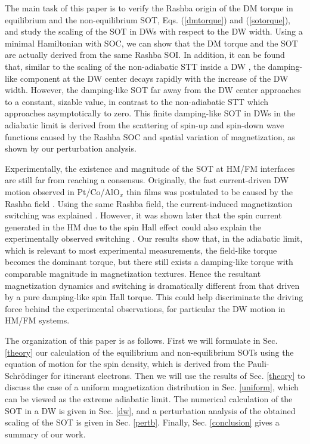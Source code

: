 \documentclass[12pt]{iopart}
\begin{document}
The main task of this paper is to verify the Rashba origin of the DM torque in equilibrium and the non-equilibrium SOT, Eqs. (\ref{dmtorque}) and (\ref{sotorque}), and study the scaling of the SOT in DWs with respect to the DW width. Using a minimal Hamiltonian with SOC, we can show that the DM torque and the SOT are actually derived from the same Rashba SOI. In addition, it can be found that, similar to the scaling of the non-adiabatic STT inside a DW \cite{Xiao06}, the damping-like component at the DW center decays rapidly with the increase of the DW width. However, the damping-like SOT far away from the DW center approaches to a constant, sizable value, in contrast to the non-adiabatic STT which approaches asymptotically to zero. This finite damping-like SOT in DWs in the adiabatic limit is derived from the scattering of spin-up and spin-down wave functions caused by the Rashba SOC and spatial variation of magnetization, as shown by our perturbation analysis.

Experimentally, the existence and magnitude of the SOT at HM/FM interfaces are still far from reaching a consensus. Originally, the fast current-driven DW motion observed in Pt/Co/AlO$_x$ thin films was postulated to be caused by the Rashba field \cite{Miron10,Miron11nm}. Using the same Rashba field, the current-induced magnetization switching was explained \cite{Miron11}. However, it was shown later that the spin current generated in the HM due to the spin Hall effect could also explain the experimentally observed switching \cite{Liu12}. Our results show that, in the adiabatic limit, which is relevant to most experimental measurements, the field-like torque becomes the dominant torque, but there still exists a damping-like torque with comparable magnitude in magnetization textures. Hence the resultant magnetization dynamics and switching is dramatically different from that driven by a pure damping-like spin Hall torque. This could help discriminate the driving force behind the experimental observations, for particular the DW motion in HM/FM systems.

The organization of this paper is as follows. First we will formulate in Sec. \ref{theory} our calculation of the equilibrium and non-equilibrium SOTs using the equation of motion for the spin density, which is derived from the Pauli-Schr\"{o}dinger for itinerant electrons. Then we will use the results of Sec. \ref{theory} to discuss the case of a uniform magnetization distribution in Sec. \ref{uniform}, which can be viewed as the extreme adiabatic limit. The numerical calculation of the SOT in a DW is given in Sec. \ref{dw}, and a perturbation analysis of the obtained scaling of the SOT is given in Sec. \ref{pertb}. Finally, Sec. \ref{conclusion} gives a summary of our work.
\end{document}
